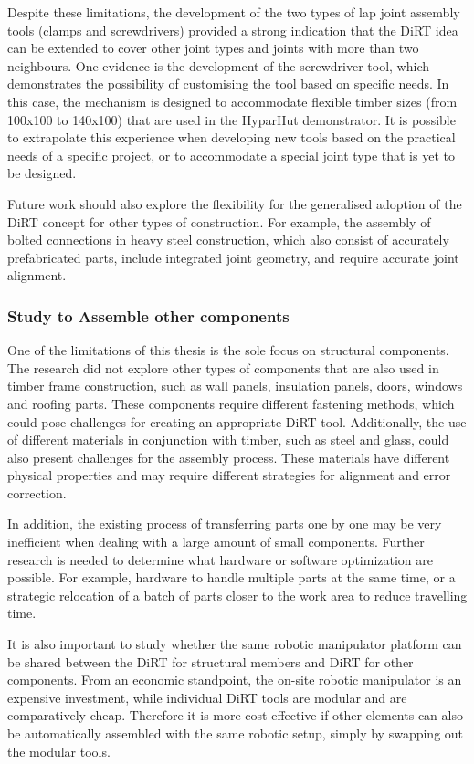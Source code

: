 \documentclass[11pt]{book}
\begin{document}
Despite these limitations, the development of the two types of lap joint assembly tools (clamps and screwdrivers) provided a strong indication that the DiRT idea can be extended to cover other joint types and joints with more than two neighbours. One evidence is the development of the screwdriver tool, which demonstrates the possibility of customising the tool based on specific needs. In this case, the mechanism is designed to accommodate flexible timber sizes (from 100x100 to 140x100) that are used in the HyparHut demonstrator. It is possible to extrapolate this experience when developing new tools based on the practical needs of a specific project, or to accommodate a special joint type that is yet to be designed. 

Future work should also explore the flexibility for the generalised adoption of the DiRT concept for other types of construction. For example, the assembly of bolted connections in heavy steel construction, which also consist of accurately prefabricated parts, include integrated joint geometry, and require accurate joint alignment. 

\subsubsection{Study to Assemble other components}

One of the limitations of this thesis is the sole focus on structural components. The research did not explore other types of components that are also used in timber frame construction, such as wall panels, insulation panels, doors, windows and roofing parts. These components require different fastening methods, which could pose challenges for creating an appropriate DiRT tool. Additionally, the use of different materials in conjunction with timber, such as steel and glass, could also present challenges for the assembly process. These materials have different physical properties and may require different strategies for alignment and error correction.

In addition, the existing process of transferring parts one by one may be very inefficient when dealing with a large amount of small components. Further research is needed to determine what hardware or software optimization are possible. For example, hardware to handle multiple parts at the same time, or a strategic relocation of a batch of parts closer to the work area to reduce travelling time. 

It is also important to study whether the same robotic manipulator platform can be shared between the DiRT for structural members and DiRT for other components. From an economic standpoint, the on-site robotic manipulator is an expensive investment, while individual DiRT tools are modular and are comparatively cheap. Therefore it is more cost effective if other elements can also be automatically assembled with the same robotic setup, simply by swapping out the modular tools.
\end{document}
